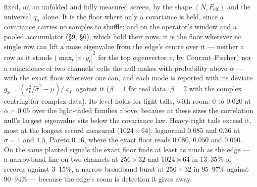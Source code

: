 \documentclass[10pt,letterpaper,twocolumn]{article}
\begin{document}
fixed, on an unfolded and fully measured screen, by the shape \((N,F_{\mathrm{eff}})\) and the universal \(q_\alpha\) alone. It is the floor where only a covariance is held, since a covariance carries no samples to shuffle; and on the operator's window and a pooled accumulator (§9, §6), which hold their rows, it is the floor wherever no single row can lift a noise eigenvalue from the edge's centre over it --- neither a row as it stands (\(\max_t|v\cdot y_t|^2\) for the top eigenvector \(v\), by Courant--Fischer) nor a coincidence of two channels' cells the null makes with probability above \(\alpha\) --- with the exact floor wherever one can, and each mode is reported with its deviate \(g_k=(s_k^2/\hat\sigma^2-\mu)/\varsigma_J\) against it (\(\beta=1\) for real data, \(\beta=2\) with the complex centring for complex data). Its level holds for light tails, with room: \(0\) to \(0.020\) at \(\alpha=0.05\) over the light-tailed families above, because at these sizes the correlation null's largest eigenvalue sits below the covariance law. Heavy right tails exceed it, most at the longest record measured (\(1024\times64\)): lognormal \(0.085\) and \(0.36\) at \(\sigma=1\) and \(1.5\), Pareto \(0.16\), where the exact floor reads \(0.080\), \(0.050\) and \(0.060\). On the same planted signals the exact floor finds at least as much as the edge --- a narrowband line on two channels at \(256\times32\) and \(1024\times64\) in \(13\)--\(35\%\) of records against \(3\)--\(15\%\), a narrow broadband burst at \(256\times32\) in \(95\)--\(97\%\) against \(90\)--\(94\%\) --- because the edge's room is detection it gives away.
\end{document}
